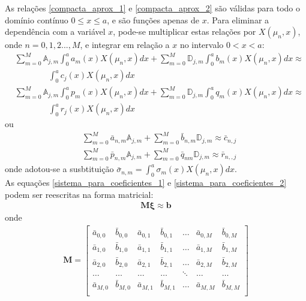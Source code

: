 As relações \eqref{compacta_aprox_1} e \eqref{compacta_aprox_2} são válidas para todo o domínio contínuo $0 \le x \le a$, e são funções apenas de $x$. Para eliminar a dependência com a variável $x$, pode-se multiplicar estas relações por $X(\mu_n, x)$, onde $n=0,1,2..., M$, e integrar em relação a $x$ no intervalo $0 < x < a$:
\begin{align}
& \sum_{m = 0}^M \mathbb{A}_{j,m}\int_0^a a_m(x)X(\mu_n, x)dx + \sum_{m = 0}^M \mathbb{D}_{j,m} \int_0^a b_m(x)X(\mu_n, x)dx \approx \nonumber \\ 
& \quad\quad\quad\quad\int_0^a c_{j}(x)X(\mu_n, x)dx \label{compacta_aprox_1_integr} \\
& \sum_{m = 0}^M \mathbb{A}_{j,m}\int_0^a p_m(x)X(\mu_n, x)dx + \sum_{m = 0}^M \mathbb{D}_{j,m} \int_0^a q_m(x)X(\mu_n, x)dx \approx \nonumber \\ 
& \quad\quad\quad\quad\int_0^a r_{j}(x)X(\mu_n, x)dx  \label{compacta_aprox_2_integr}
\end{align}
ou
\begin{align}
& \sum_{m = 0}^M \bar{a}_{n,m} \mathbb{A}_{j,m} + \sum_{m = 0}^M \bar{b}_{n,m} \mathbb{D}_{j,m} \approx \bar{c}_{n,j} \label{sistema_para_coeficientes_1}
\\
& \sum_{m = 0}^M \bar{p}_{n,m} \mathbb{A}_{j,m} + \sum_{m = 0}^M \bar{q}_{nm} \mathbb{D}_{j,m} \approx \bar{r}_{n,,j} \label{sistema_para_coeficientes_2}
\end{align}
onde adotou-se a susbtituição $\bar{\sigma}_{n,m} = \displaystyle \int_0^a \sigma_m(x)X(\mu_n, x)dx$.
\\

As equações \eqref{sistema_para_coeficientes_1} e \eqref{sistema_para_coeficientes_2} podem ser reescritas na forma matricial:
\begin{align}
\mathbf{M}\mathbf{\xi} \approx \mathbf{b} \label{sistema_para_coeficientes_3}
\end{align}
onde
\begin{align}
\mathbf{M} =
\begin{bmatrix}
\bar{a}_{0,0} & \bar{b}_{0,0} & \bar{a}_{0,1} & \bar{b}_{0,1} &  \ldots & \bar{a}_{0,M} & \bar{b}_{0,M} \\
\bar{a}_{1,0} & \bar{b}_{1,0} & \bar{a}_{1,1} & \bar{b}_{1,1} &  \ldots & \bar{a}_{1,M} & \bar{b}_{1,M} \\
\bar{a}_{2,0} & \bar{b}_{2,0} & \bar{a}_{2,1} & \bar{b}_{2,1} &  \ldots & \bar{a}_{2,M} & \bar{b}_{2,M} \\
\ldots & \ldots & \ldots & \ldots & \ddots & \ldots & \ldots\\
\bar{a}_{M,0} & \bar{b}_{M,0} & \bar{a}_{M,1} & \bar{b}_{M,1} &  \ldots & \bar{a}_{M,M} & \bar{b}_{M,M} \\
\end{bmatrix}
\end{align}

